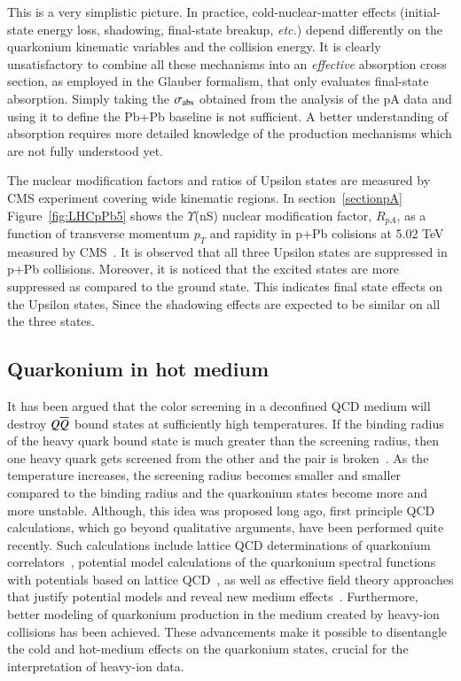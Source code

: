 This is a very simplistic picture. In practice, cold-nuclear-matter effects 
(initial-state energy loss, shadowing, final-state breakup, {\it etc.}) 
depend differently on the quarkonium kinematic variables and the collision energy. 
It is clearly unsatisfactory to combine all these mechanisms into an {\it effective} 
absorption cross section, as employed in the Glauber formalism, 
that only evaluates final-state absorption. 
Simply taking the $\sigma_{\rm abs}$ obtained from 
the analysis of the pA data 
and using it to define the Pb+Pb baseline is not sufficient. 
A better understanding of absorption requires more detailed knowledge of the 
production mechanisms which are not fully understood yet.


The nuclear modification factors and ratios of Upsilon states are measured by CMS
experiment covering wide kinematic regions.
In section~\ref{sectionpA} Figure~\ref{fig:LHCpPb5} shows the $\Upsilon$(nS) nuclear
modification factor, $R_{pA}$,  as a function of transverse momentum $p_{T}$ 
and rapidity in p+Pb colisions at 5.02 TeV measured by CMS~\cite{CMS:2022wfi}.
It is observed that all three Upsilon states are suppressed in p+Pb collisions.
Moreover, it is noticed that the excited states are more suppressed as compared
to the ground state. This indicates final state effects on the Upsilon states,
Since the shadowing effects are expected to be similar on
all the three states.


\subsection{Quarkonium in hot medium}
\label{sec:media_sec3}

It has been argued that the color screening 
in a deconfined QCD medium will destroy $Q \overline{Q}$ bound states
at sufficiently high temperatures. If the binding radius of the heavy
quark bound state is  much greater than the screening radius, then one heavy 
quark gets screened from the other and the pair is broken~\cite{Abdulsalam:2012bw}.
As the temperature 
increases, the screening radius becomes smaller and smaller compared to the 
binding radius and the quarkonium states become more and more unstable. 
Although, this idea was proposed long ago, first principle QCD calculations, 
which go beyond qualitative arguments, have been performed quite recently. 
Such calculations include lattice QCD determinations of quarkonium 
correlators~\cite{Umeda:2002vr,Asakawa:2003re,Datta:2003ww,Jakovac:2006sf,Aarts:2007pk},
potential model calculations 
of the quarkonium spectral functions with potentials based on lattice 
QCD~\cite{Digal:2001ue,Wong:2004zr,Mocsy:2005qw,Mocsy:2004bv,Alberico:2006vw,Cabrera:2006wh,Mocsy:2007yj,Mocsy:2007jz},
as well as effective 
field theory approaches that justify potential models and reveal new medium 
effects~\cite{Laine:2007qy,Laine:2007gj,Laine:2008cf,Brambilla:2008cx}.  
Furthermore, better modeling of 
quarkonium production in the medium created by heavy-ion collisions has 
been achieved.   These advancements make it possible to disentangle the cold
and hot-medium effects on the quarkonium states, crucial for the 
interpretation of heavy-ion data. 



